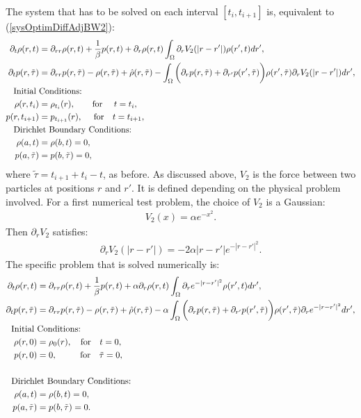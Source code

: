 The system that has to be solved on each interval $[t_i,t_{i+1}]$ is, equivalent to (\ref{sysOptimDiffAdjBW2}):
\begin{align*}
\partial_t \rho(r,t) &= \partial_{rr}\rho(r,t) + \frac{1}{\beta}{p}(r,t) + \partial_r  \rho(r,t) \int_\Omega \partial_r V_2(|r-r'|) \rho(r',t)dr', \\
\partial_t {p}(r,\tilde\tau) &= \partial_{rr}{p}(r,\tilde\tau) - \rho(r,\tilde\tau) +\hat{\rho}(r,\tilde\tau) -\int_\Omega \bigg(\partial_r  p(r,\tilde\tau)+\partial_{r'}  p(r',\tilde\tau)\bigg) \rho(r',\tilde\tau) \partial_r V_2(|r-r'|) dr', \notag \\
\text{Initial } & \text{Conditions:} \notag  \\
\rho(r,t_i)&=\rho_{t_i}(r), \quad \quad\text{for} \ \quad t=t_i, \notag \\
{p}(r,t_{i+1}) &=p_{t_{i+1}}(r), \  \quad \text{for} \quad t=t_{i+1}, \notag \\
\text{Dirichl}&\text{et Boundary Conditions:} \notag \\
\rho(a,t) &=\rho(b,t)=0, \notag \\
{p}(a,\tilde\tau) &={p}(b,\tilde\tau)=0, \notag 
\end{align*} 
where $\tilde\tau=t_{i+1} +t_i -t$, as before.
As discussed above, $V_2$ is the force between two particles at positions $r$ and $r'$. It is defined depending on the physical problem involved. For a first numerical test problem, the choice of $V_2$ is a Gaussian:
\begin{align}\label{eqn1Dgaussian}
V_2(x)= \alpha e^{-x^2}.
\end{align}
Then $\partial_r V_2$ satisfies:
\begin{align*}
\partial_r V_2(|r-r'|)= -2\alpha|r-r'| e^{-|r-r'|^2}.
\end{align*}
The specific problem that is solved numerically is:
\begin{align}\label{OptmSysNonloc1alpha}
\partial_t \rho(r,t) &= \partial_{rr}\rho(r,t) + \frac{1}{\beta}{p}(r,t) + \alpha \partial_r  \rho(r,t) \int_\Omega \partial_r  e^{-|r-r'|^2} \rho(r',t)dr', \\
\partial_t {p}(r,\tilde\tau) &= \partial_{rr}{p}(r,\tilde\tau) - \rho(r,\tilde\tau) +\hat{\rho}(r,\tilde\tau) - \alpha\int_\Omega \bigg(\partial_r  p(r,\tilde\tau)+\partial_{r'}  p(r',\tilde\tau)\bigg) \rho(r',\tilde\tau) \partial_r  e^{-|r-r'|^2} dr', \notag \\
\text{Initial } & \text{Conditions:} \notag  \\
\rho(r,0)&=\rho_0(r), \quad \text{for}  \quad t=0, \notag \\
{p}(r,0) &=0,\quad \ \ \quad \text{for} \quad \tilde \tau=0, \notag \\
\notag \\
\text{Dirichl}&\text{et Boundary Conditions:} \notag \\
\rho(a,t) &=\rho(b,t)=0, \notag \\
{p}(a,\tilde\tau) &={p}(b,\tilde\tau)=0. \notag 
\end{align} 


